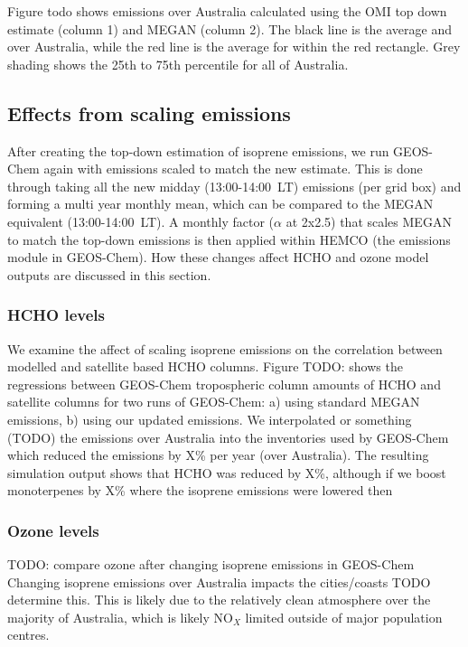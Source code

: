     
    
    Figure todo shows emissions over Australia calculated using the OMI top down estimate (column 1) and MEGAN (column 2). 
    The black line is the average and over Australia, while the red line is the average for within the red rectangle. 
    Grey shading shows the 25th to 75th percentile for all of Australia.
    
  \subsection{Effects from scaling emissions}
    
    After creating the top-down estimation of isoprene emissions, we run GEOS-Chem again with emissions scaled to match the new estimate. 
    This is done through taking all the new midday (13:00-14:00~LT) emissions (per grid box) and forming a multi year monthly mean, which can be compared to the MEGAN equivalent (13:00-14:00~LT).
    A monthly factor ($\alpha$ at 2x2.5\degr) that scales MEGAN to match the top-down emissions is then applied within HEMCO (the emissions module in GEOS-Chem).
    How these changes affect HCHO and ozone model outputs are discussed in this section.
    
    \subsubsection{HCHO levels}
      
      We examine the affect of scaling isoprene emissions on the correlation between modelled and satellite based HCHO columns.
      Figure TODO: shows the regressions between GEOS-Chem tropospheric column amounts of HCHO and satellite columns for two runs of GEOS-Chem: a) using standard MEGAN emissions, b) using our updated emissions.
      We interpolated or something (TODO) the emissions over Australia into the inventories used by GEOS-Chem which reduced the emissions by X\% per year (over Australia).
      The resulting simulation output shows that HCHO was reduced by X\%, although if we boost monoterpenes by X\% where the isoprene emissions were lowered then 
  
    \subsubsection{Ozone levels}
  
      TODO: compare ozone after changing isoprene emissions in GEOS-Chem
      Changing isoprene emissions over Australia impacts the cities/coasts TODO determine this.
      This is likely due to the relatively clean atmosphere over the majority of Australia, which is likely NO$_X$ limited outside of major population centres.
      
